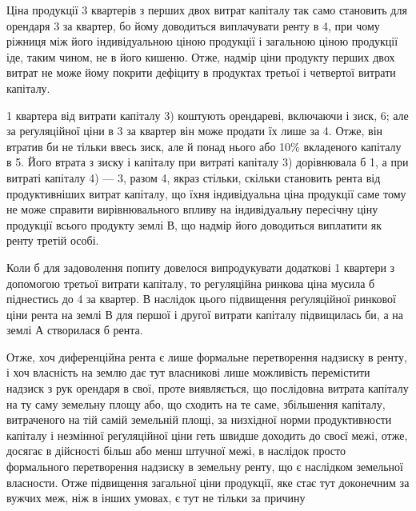 Ціна продукції 3 квартерів з перших двох витрат капіталу так само
становить для орендаря 3 за квартер, бо йому доводиться виплачувати
ренту в 4, при чому ріжниця між його індивідуальною ціною продукції
і загальною ціною продукції іде, таким чином, не в його кишеню. Отже,
надмір ціни продукту перших двох витрат не може йому покрити дефіциту
в продуктах третьої і четвертої витрати капіталу.

1 квартера від витрати капіталу 3) коштують орендареві, включаючи
і зиск, 6; але за реґуляційної ціни в 3 за квартер він може
продати їх лише за 4. Отже, він втратив би не тільки ввесь
зиск, але й понад нього  або  10\% вкладеного капіталу в 5.
Його втрата з зиску і капіталу при витраті капіталу 3) дорівнювала б  1, а при витраті капіталу 4) — 3, разом 4, якраз
стільки, скільки становить рента від продуктивніших витрат капіталу, що їхня
індивідуальна ціна продукції саме тому не може справити вирівнювального
впливу на індивідуальну пересічну ціну продукції всього продукту землі $В$, що
надмір його доводиться виплатити як ренту третій особі.

Коли б для задоволення попиту довелося випродукувати додаткові 1
квартери з допомогою третьої витрати капіталу, то регуляційна ринкова ціна
мусила б піднестись до 4 за квартер. В наслідок цього підвищення
реґуляційної ринкової ціни рента на землі $В$ для першої і другої витрати капіталу
підвищилась би, а на землі $А$ створилася б рента.

Отже, хоч диференційна рента є лише формальне перетворення надзиску
в ренту, і хоч власність на землю дає тут власникові лише можливість перемістити
надзиск з рук орендаря в свої, проте виявляється, що послідовна витрата
капіталу на ту саму земельну площу або, що сходить на те саме, збільшення
капіталу, витраченого на тій самій земельній площі, за низхідної норми
продуктивности капіталу і незмінної реґуляційної ціни геть швидше доходить
до своєї межі, отже, досягає в дійсності більш або менш штучної межі, в наслідок
просто формального перетворення надзиску в земельну ренту, що є наслідком
земельної власности. Отже підвищення загальної ціни продукції, яке стає
тут доконечним за вужчих меж, ніж в інших умовах, є тут не тільки за причину
\parbreak{}  %
